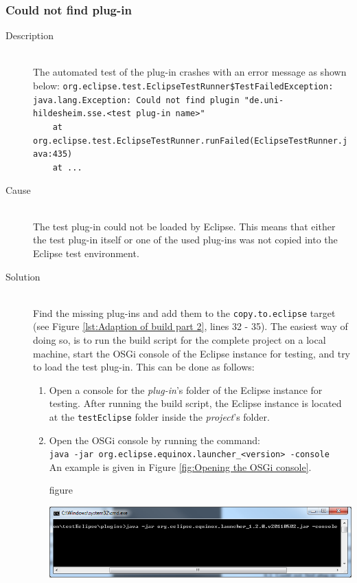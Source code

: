 \subsubsection{Could not find plug-in}
\label{sec:Could not find plug-in}
\begin{description}
	\item[Description] $ $\\
		The automated test of the plug-in crashes with an error message as shown below:
		\footnotesize
			\verb|org.eclipse.test.EclipseTestRunner$TestFailedException:|\\
			\color{red}\verb|java.lang.Exception: Could not find plugin "de.uni-hildesheim.sse.<test plug-in name>"|\\
			\color{black}\verb|    at org.eclipse.test.EclipseTestRunner.runFailed(EclipseTestRunner.java:435)|\\
			\verb|    at ...|
		\normalsize
	\item[Cause] $ $\\
	The test plug-in could not be loaded by Eclipse. This means that either the test plug-in itself or one of the used plug-ins was not copied into the Eclipse test environment.
	\item[Solution] $ $\\
	Find the missing plug-ins and add them to the \texttt{copy.to.eclipse} target (see Figure \vref{lst:Adaption of build part 2}, lines 32 - 35). The easiest way of doing so, is to run the build script for the complete project on a local machine, start the OSGi console of the Eclipse instance for testing, and try to load the test plug-in. This can be done as follows:
	\begin{enumerate}
		\item Open a console for the \textit{plug-in}'s folder of the Eclipse instance for testing. After running the build script, the Eclipse instance is located at the \texttt{testEclipse} folder inside the \textit{project}'s folder.
		\item Open the OSGi console by running the command:\\
			\texttt{java -jar org.eclipse.equinox.launcher\_<version> -console}\\
			An example is given in Figure \vref{fig:Opening the OSGi console}.
			\begin{nofloat}{figure}
				\ifpdf	
				\begin{center}
				\hspace{-1.85cm}\includegraphics[width=\textwidth]{pictures/faq/OSGiConsole}

\end{center}
\end{nofloat}
\end{enumerate}
\end{description}
